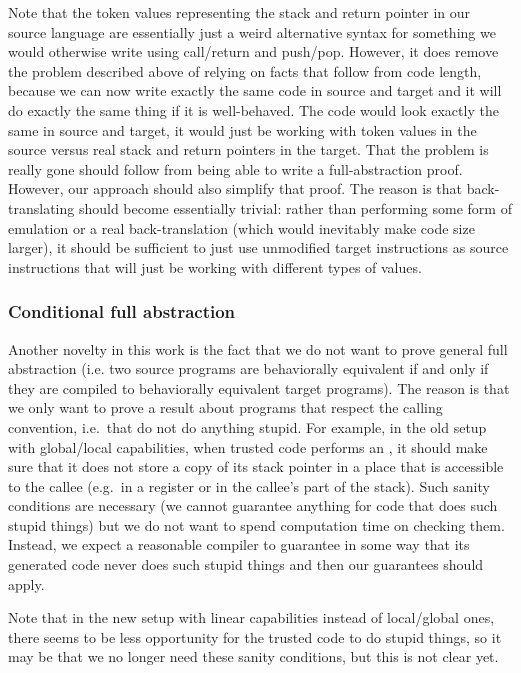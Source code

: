 \documentclass[a4paper]{article}
\begin{document}
Note that the token values representing the stack and return pointer in our source language are essentially just a weird alternative syntax for something we would otherwise write using call/return and push/pop.
However, it does remove the problem described above of relying on facts that follow from code length, because we can now write exactly the same code in source and target and it will do exactly the same thing if it is well-behaved.
The code would look exactly the same in source and target, it would just be working with token values in the source versus real stack and return pointers in the target.
That the problem is really gone should follow from being able to write a full-abstraction proof.
However, our approach should also simplify that proof.
The reason is that back-translating should become essentially trivial: rather than performing some form of emulation or a real back-translation (which would inevitably make code size larger), it should be sufficient to just use unmodified target instructions as source instructions that will just be working with different types of values.


\subsubsection{Conditional full abstraction}
\label{sec:conditional-full-abstraction}

Another novelty in this work is the fact that we do not want to prove general full abstraction (i.e. two source programs are behaviorally equivalent if and only if they are compiled to behaviorally equivalent target programs).
The reason is that we only want to prove a result about programs that respect the calling convention, i.e.\ that do not do anything stupid.
For example, in the old setup with global/local capabilities, when trusted code performs an \scall{\offpc,\offsigma}{}{}, it should make sure that it does not store a copy of its stack pointer in a place that is accessible to the callee (e.g.\ in a register or in the callee's part of the stack).
Such sanity conditions are necessary (we cannot guarantee anything for code that does such stupid things) but we do not want to spend computation time on checking them.
Instead, we expect a reasonable compiler to guarantee in some way that its generated code never does such stupid things and then our guarantees should apply.

Note that in the new setup with linear capabilities instead of local/global ones, there seems to be less opportunity for the trusted code to do stupid things, so it may be that we no longer need these sanity conditions, but this is not clear yet.
\end{document}
